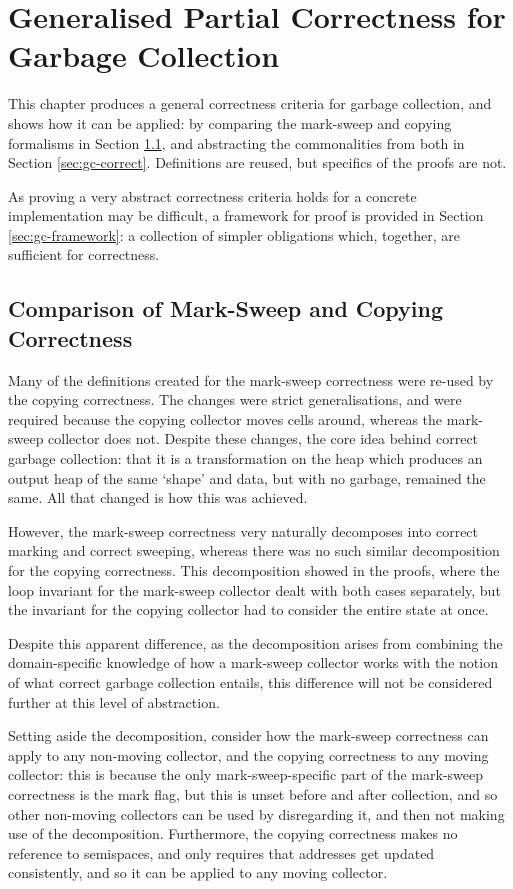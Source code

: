 \chapter{Generalised Partial Correctness for Garbage Collection}
\label{sec:gc}

This chapter produces a general correctness criteria for garbage
collection, and shows how it can be applied: by comparing the
mark-sweep and copying formalisms in Section \ref{sec:gc-comparison},
and abstracting the commonalities from both in Section
\ref{sec:gc-correct}. Definitions are reused, but specifics of the
proofs are not.

As proving a very abstract correctness criteria holds for a concrete
implementation may be difficult, a framework for proof is provided in
Section \ref{sec:gc-framework}: a collection of simpler obligations
which, together, are sufficient for correctness.

\section{Comparison of Mark-Sweep and Copying Correctness}
\label{sec:gc-comparison}

Many of the definitions created for the mark-sweep correctness were
re-used by the copying correctness. The changes were strict
generalisations, and were required because the copying collector moves
cells around, whereas the mark-sweep collector does not. Despite these
changes, the core idea behind correct garbage collection: that it is
a transformation on the heap which produces an output heap of the same
`shape' and data, but with no garbage, remained the same. All that
changed is how this was achieved.

However, the mark-sweep correctness very naturally decomposes into
correct marking and correct sweeping, whereas there was no such
similar decomposition for the copying correctness. This decomposition
showed in the proofs, where the loop invariant for the mark-sweep
collector dealt with both cases separately, but the invariant for the
copying collector had to consider the entire state at once.

Despite this apparent difference, as the decomposition arises from
combining the domain-specific knowledge of how a mark-sweep collector
works with the notion of what correct garbage collection entails, this
difference will not be considered further at this level of
abstraction.

Setting aside the decomposition, consider how the mark-sweep
correctness can apply to any non-moving collector, and the copying
correctness to any moving collector: this is because the only
mark-sweep-specific part of the mark-sweep correctness is the mark
flag, but this is unset before and after collection, and so other
non-moving collectors can be used by disregarding it, and then not
making use of the decomposition. Furthermore, the copying correctness
makes no reference to semispaces, and only requires that addresses get
updated consistently, and so it can be applied to any moving
collector.

